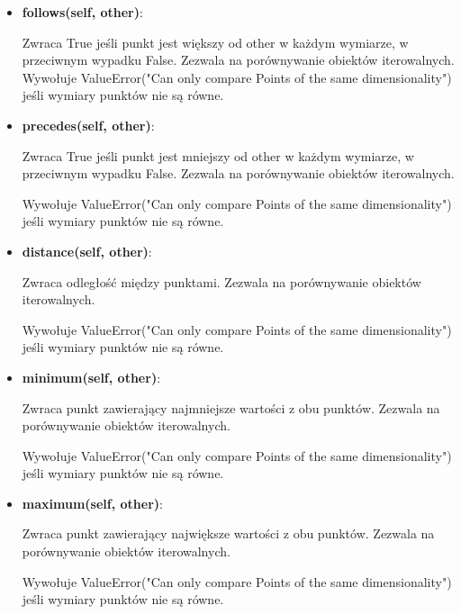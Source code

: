\documentclass{lab}
\begin{document}
\begin{itemize}
    \item \textbf{follows(self, other)}:
    
    Zwraca True jeśli punkt jest większy od other w każdym wymiarze, w przeciwnym wypadku False. Zezwala na porównywanie obiektów iterowalnych.
    Wywołuje ValueError("Can only compare Points of the same dimensionality") jeśli wymiary punktów nie są równe.

    \item \textbf{precedes(self, other)}:
    
    Zwraca True jeśli punkt jest mniejszy od other w każdym wymiarze, w przeciwnym wypadku False. Zezwala na porównywanie obiektów iterowalnych.

    Wywołuje ValueError("Can only compare Points of the same dimensionality") jeśli wymiary punktów nie są równe.

    \item \textbf{distance(self, other)}:
    
    Zwraca odległość między punktami. Zezwala na porównywanie obiektów iterowalnych.

    Wywołuje ValueError("Can only compare Points of the same dimensionality") jeśli wymiary punktów nie są równe.

    \item \textbf{minimum(self, other)}:

    Zwraca punkt zawierający najmniejsze wartości z obu punktów. Zezwala na porównywanie obiektów iterowalnych.

    Wywołuje ValueError("Can only compare Points of the same dimensionality") jeśli wymiary punktów nie są równe.

    \item \textbf{maximum(self, other)}:
    
    Zwraca punkt zawierający największe wartości z obu punktów. Zezwala na porównywanie obiektów iterowalnych.

    Wywołuje ValueError("Can only compare Points of the same dimensionality") jeśli wymiary punktów nie są równe.    
\end{itemize}
\end{document}
